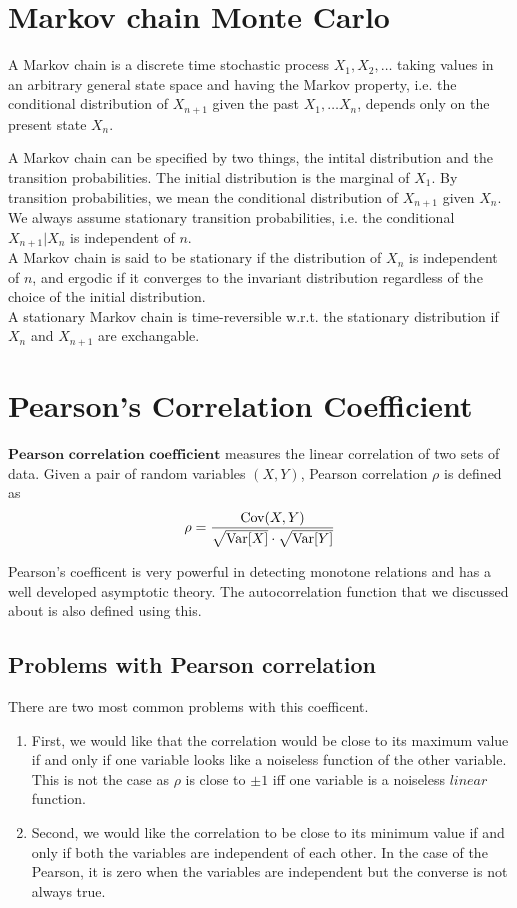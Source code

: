 \documentclass{article}
\begin{document}
\section{Markov chain Monte Carlo}
	A Markov chain is a discrete time stochastic process $X_1, X_2, \dots$ taking values in an arbitrary general state space and having the Markov property,
	i.e. the conditional distribution of $X_{n+1}$ given the past $X_1, \dots X_n$, depends only on the present state $X_n$.

	A Markov chain can be specified by two things, the intital distribution and the transition probabilities.
	The initial distribution is the marginal of $X_1$. By transition probabilities, we mean the conditional distribution of $X_{n+1}$ given $X_n$.
	We always assume stationary transition probabilities, i.e. the conditional $X_{n+1}|X_n$ is independent of $n$.\\
	A Markov chain is said to be stationary if the distribution of $X_n$ is independent of $n$,
	and ergodic if it converges to the invariant distribution regardless of the choice of the initial distribution.\\
	A stationary Markov chain is time-reversible w.r.t. the stationary distribution if $X_n$ and $X_{n+1}$ are exchangable.

\section{Pearson's Correlation Coefficient}
	$\textbf{Pearson correlation coefficient}$ measures the linear correlation of two sets of data.
	Given a pair of random variables $(X, Y)$, Pearson correlation $\rho$ is defined as
	$$\rho = \frac{\text{Cov}(X, Y)}{\sqrt{\text{Var}[X]} \cdot \sqrt{\text{Var}[Y]}}$$

	Pearson's coefficent is very powerful in detecting monotone relations and
	has a well developed asymptotic theory. The autocorrelation function that we discussed about is also defined using this.

	\subsection{Problems with Pearson correlation}
		There are two most common problems with this coefficent.
		\begin{enumerate}
			\item First, we would like that the correlation would be close to its maximum value
			if and only if one variable looks like a noiseless function of the other variable.
			This is not the case as $\rho$ is close to $\pm 1$ iff one variable is a noiseless $\textit{linear}$ function.
			\item Second, we would like the correlation to be close to its minimum value if and only if both the variables are independent of each other.
			In the case of the Pearson, it is zero when the variables are independent but the converse is not always true.
		\end{enumerate}
\end{document}

